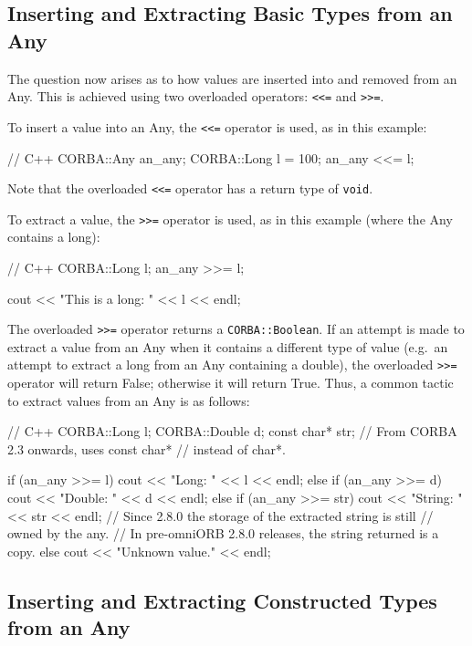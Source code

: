 \documentclass[11pt,twoside,a4paper]{book}
\newcommand{\type}[1]{\texttt{#1}}
\newcommand{\code}[1]{\texttt{#1}}
\begin{document}
\subsection{Inserting and Extracting Basic Types from an Any}

The question now arises as to how values are inserted into and removed
from an Any. This is achieved using two overloaded operators:
\code{<{}<=} and \code{>{}>=}.

To insert a value into an Any, the \code{<{}<=} operator is used, as
in this example:

\begin{cxxlisting}
// C++
CORBA::Any an_any;
CORBA::Long l = 100;
an_any <<= l;
\end{cxxlisting}


Note that the overloaded \code{<{}<=} operator has a return type of
\type{void}.

To extract a value, the \code{>{}>=} operator is used, as in this
example (where the Any contains a long):

\begin{cxxlisting}
// C++
CORBA::Long l;
an_any >>= l;

cout << "This is a long: " << l << endl;
\end{cxxlisting}


The overloaded \code{>{}>=} operator returns a \type{CORBA::Boolean}.
If an attempt is made to extract a value from an Any when it contains
a different type of value (e.g.\ an attempt to extract a long from an
Any containing a double), the overloaded \code{>{}>=} operator will
return False; otherwise it will return True. Thus, a common tactic to
extract values from an Any is as follows:

\begin{cxxlisting}
// C++
CORBA::Long l;
CORBA::Double d;
const char* str;     // From CORBA 2.3 onwards, uses const char*
                     // instead of char*. 

if (an_any >>= l) {
    cout << "Long: " << l << endl;
}
else if (an_any >>= d) {
    cout << "Double: " << d << endl;
}
else if (an_any >>= str) {
    cout << "String: " << str << endl;
    // Since 2.8.0 the storage of the extracted string is still
    // owned by the any.
    // In pre-omniORB 2.8.0 releases, the string returned is a copy.
}
else {
    cout << "Unknown value." << endl;
}
\end{cxxlisting}


\subsection{Inserting and Extracting Constructed Types from an Any}
\end{document}
